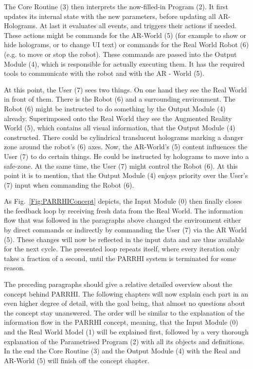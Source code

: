 The Core Routine (3) then interprets the now-filled-in Program (2). It first updates its internal state with the new parameters, before updating all AR-Holograms. At last it evaluates all events, and triggers their actions if needed. These actions might be commands for the AR-World (5) (for example to show or hide holograms, or to change UI text) or commands for the Real World Robot (6) (e.g. to move or stop the robot). These commands are passed into the Output Module (4), which is responsible for actually executing them. It has the required tools to communicate with the robot and with the AR - World (5). 

At this point, the User (7) sees two things. On one hand they see the Real World in front of them. There is the Robot (6) and a surrounding environment. The Robot (6) might be instructed to do something by the Output Module (4) already. Superimposed onto the Real World they see the Augmented Reality World (5), which contains all visual information, that the Output Module (4) constructed. There could be cylindrical translucent holograms marking a danger zone around the robot's (6) axes. Now, the AR-World's (5) content influences the User (7) to do certain things. He could be instructed by holograms to move into a safe-zone. At the same time, the User (7) might control the Robot (6). At this point it is to mention, that the Output Module (4) enjoys priority over the User's (7) input when commanding the Robot (6).

As Fig.~\ref{Fig:PARRHIConcept} depicts, the Input Module (0) then finally closes the feedback loop by receiving fresh data from the Real World. The information flow that was followed in the paragraphs above changed the environment either by direct commands or indirectly by commanding the User (7) via the AR World (5). These changes will now be reflected in the input data and are thus available for the next cycle. The presented loop repeats itself, where every iteration only takes a fraction of a second, until the PARRHI system is terminated for some reason. 

The preceding paragraphs should give a relative detailed overview about the concept behind PARRHI. The following chapters will now explain each part in an even higher degree of detail, with the goal being, that almost no questions about the concept stay unanswered. The order will be similar to the explanation of the information flow in the PARRHI concept, meaning, that the Input Module (0) and the Real World Model (1) will be explained first, followed by a very thorough explanation of the Parametrised Program (2) with all its objects and definitions. In the end the Core Routine (3) and the Output Module (4) with the Real and AR-World (5) will finish off the concept chapter.



